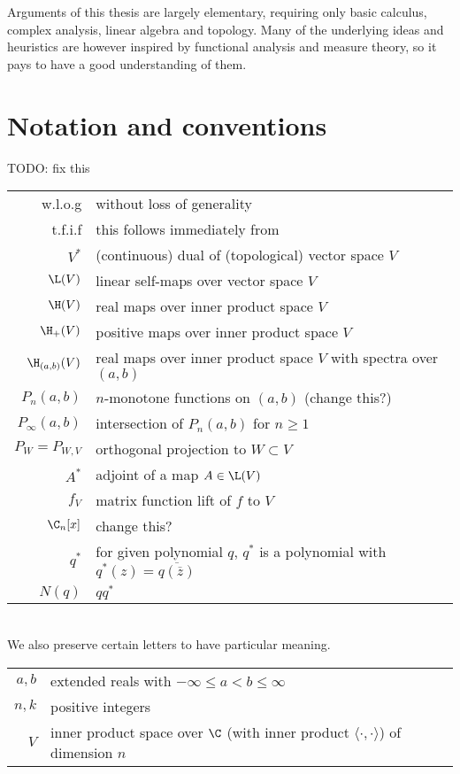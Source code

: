 Arguments of this thesis are largely elementary, requiring only basic calculus, complex analysis, linear algebra and topology. Many of the underlying ideas and heuristics are however inspired by functional analysis and measure theory, so it pays to have a good understanding of them.

\section{Notation and conventions}

TODO: fix this

\begin{tabular}{r l}
	w.l.o.g & without loss of generality \\
	t.f.i.f & this follows immediately from \\
	$V^{*}$ & (continuous) dual of (topological) vector space $V$ \\
	$\L(V)$ & linear self-maps over vector space $V$ \\
	$\H(V)$ & real maps over inner product space $V$ \\
	$\H_{+}(V)$ & positive maps over inner product space $V$ \\
	$\H_{(a, b)}(V)$ & real maps over inner product space $V$ with spectra over $(a, b)$ \\
	$P_{n}(a, b)$ & $n$-monotone functions on $(a, b)$ (change this?) \\
	$P_{\infty}(a, b)$ & intersection of $P_{n}(a, b)$ for $n \geq 1$ \\
	$P_{W} = P_{W, V}$ & orthogonal projection to $W \subset V$ \\
	$A^{*}$ & adjoint of a map $A \in \L(V)$ \\
	$f_{V}$ & matrix function lift of $f$ to $V$ \\
	$\C_{n}[x]$ & change this? \\
	$q^{*}$ & for given polynomial $q$, $q^{*}$ is a polynomial with $q^{*}(z) = \overline{q(\overline{z})}$ \\
	$N(q)$ & $q q^{*}$
\end{tabular}
\\
We also preserve certain letters to have particular meaning.
\\
\begin{tabular}{r l}
	$a, b$ & extended reals with $-\infty \leq a < b \leq \infty$ \\ 
	$n, k$ & positive integers \\
	$V$ & inner product space over $\C$ (with inner product $\langle \cdot, \cdot \rangle$) of dimension $n$ \\
\end{tabular}


